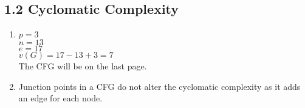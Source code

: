 \documentclass{scrartcl}
\begin{document}
\subsection*{1.2 Cyclomatic Complexity}
\begin{enumerate}
	\item $ p = 3 $ \\
		$ n = 13 $ \\
		$ e = 17 $ \\
		$ v(G) = 17 - 13 + 3 = 7 $  \\
                The CFG will be on the last page.
	
	\item Junction points in a CFG do not alter the cyclomatic complexity as it adds an edge for each node.
	
\end{enumerate}
\end{document}
